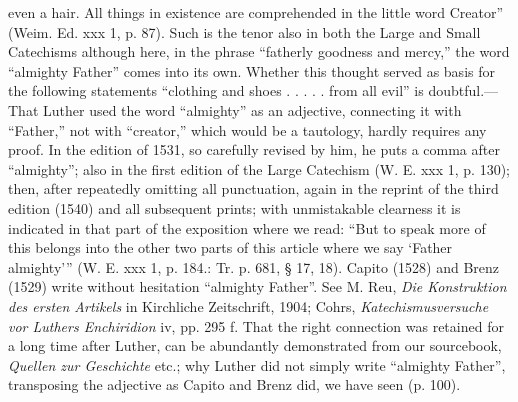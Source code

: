 even a hair. All things in existence are comprehended in the little word Creator” (Weim. Ed. xxx 1, p. 87). Such is the tenor also in both the Large and Small Catechisms although here, in the phrase “fatherly goodness and mercy,” the word “almighty Father” comes into its own. Whether this thought served as basis for the following statements “clothing and shoes . . . . . from all evil” is doubtful.—That Luther used the word “almighty” as an adjective, connecting it with “Father,” not with “creator,” which would be a tautology, hardly requires any proof. In the edition of 1531, so carefully revised by him, he puts a comma after “almighty”; also in the first edition of the Large Catechism (W. E. xxx 1, p. 130); then, after repeatedly omitting all punctuation, again in the reprint of the third edition (1540) and all subsequent prints; with unmistakable clearness it is indicated in that part of the exposition where we read: “But to speak more of this belongs into the other two parts of this article where we say ‘Father almighty’” (W. E. xxx 1, p. 184.: Tr. p. 681, § 17, 18). Capito (1528) and Brenz (1529) write without hesitation “almighty Father”. See M. Reu, \emph{Die Konstruktion des ersten Artikels} in Kirchliche Zeitschrift, 1904; Cohrs, \emph{Katechismusversuche vor Luthers Enchiridion} iv, pp. 295 f. That the right connection was retained for a long time after Luther, can be abundantly demonstrated from our sourcebook, \emph{Quellen zur Geschichte} etc.; why Luther did not simply write “almighty Father”, transposing the adjective as Capito and Brenz did, we have seen (p. 100).

